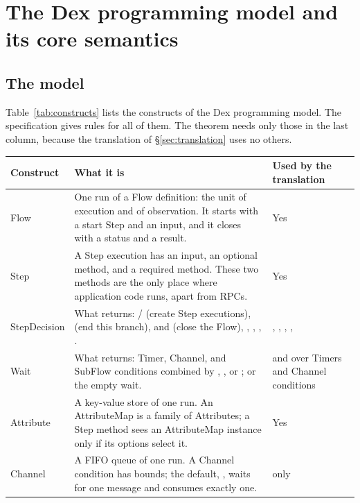 \section{The Dex programming model and its core semantics}
\label{sec:dex}

\subsection{The model}
\label{sec:dex-model}

Table~\ref{tab:constructs} lists the constructs of the Dex programming
model. The specification gives rules for all of them. The theorem needs only
those in the last column, because the translation of \S\ref{sec:translation}
uses no others.

\begin{table}[t]
\centering
\small
\begin{tabularx}{\textwidth}{@{}P{2.5cm}LP{2.6cm}@{}}
\toprule
Construct & What it is & Used by the translation \\
\midrule
Flow & One run of a Flow definition: the unit of execution and of
  observation. It starts with a start Step and an input, and it closes with
  a status and a result. & Yes \\
Step & A Step execution has an input, an optional  method, and a
  required  method. These two methods are the only place where
  application code runs, apart from RPCs. & Yes \\
StepDecision & What  returns: / (create
  Step executions),  (end this branch),  and
   (close the Flow), ,
  , ,
  . & , , ,
  ,  \\
Wait & What  returns: Timer, Channel, and SubFlow conditions
  combined by , , or ; or the empty
  wait. &  and  over Timers and  Channel
  conditions \\
Attribute & A key-value store of one run. An AttributeMap is a family of
  Attributes; a Step method sees an AttributeMap instance only if its
  options select it. & Yes \\
Channel & A FIFO queue of one run. A Channel condition has bounds; the
  default, , waits for one message and consumes exactly one. &
   only \\

\end{tabularx}
\end{table}
